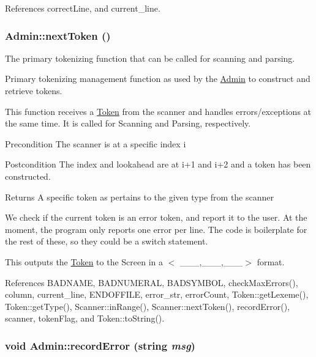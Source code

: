 References correctLine, and current\_\-line.

\hypertarget{classAdmin_a7d32bf0c9bcc29be8f622e9b07cfb3d8}{
\subsubsection[{nextToken}]{ Admin::nextToken ()}}
\label{classAdmin_a7d32bf0c9bcc29be8f622e9b07cfb3d8}


The primary tokenizing function that can be called for scanning and parsing. 

Primary tokenizing management function as used by the \hyperlink{classAdmin}{Admin} to construct and retrieve tokens.

This function receives a \hyperlink{classToken}{Token} from the scanner and handles errors/exceptions at the same time. It is called for Scanning and Parsing, respectively.

\begin{DoxyPrecond}{Precondition}
The scanner is at a specific index i 
\end{DoxyPrecond}
\begin{DoxyPostcond}{Postcondition}
The index and lookahead are at i+1 and i+2 and a token has been constructed. 
\end{DoxyPostcond}
\begin{DoxyReturn}{Returns}
A specific token as pertains to the given type from the scanner 
\end{DoxyReturn}


We check if the current token is an error token, and report it to the user. At the moment, the program only reports one error per line. The code is boilerplate for the rest of these, so they could be a switch statement.

This outputs the \hyperlink{classToken}{Token} to the Screen in a $<$ \_\-\_\-\_\-,\_\-\_\-\_\-,\_\-\_\-\_\-$>$ format. 



References BADNAME, BADNUMERAL, BADSYMBOL, checkMaxErrors(), column, current\_\-line, ENDOFFILE, error\_\-str, errorCount, Token::getLexeme(), Token::getType(), Scanner::inRange(), Scanner::nextToken(), recordError(), scanner, tokenFlag, and Token::toString().

\hypertarget{classAdmin_a6519bde7fd1ffd997a66987c2417d7bd}{
\subsubsection[{recordError}]{\setlength{\rightskip}{0pt plus 5cm}void Admin::recordError (string {\em msg})}}
\label{classAdmin_a6519bde7fd1ffd997a66987c2417d7bd}


